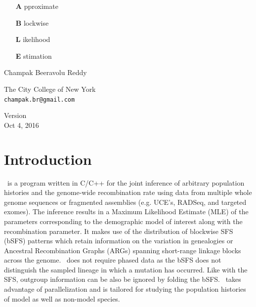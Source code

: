 \documentclass[pdftex,12pt]{article}
\newcommand{\incode}[1]{\tcbox[colback=blue!10!gray!10, colframe=blue!10!gray!40, boxrule=0.5pt, on line, size=fbox]{\texttt{\detokenize{#1}}}}
\newcommand{\ABLE}{\incode{ABLE}}
\newcommand{\RED}[1]{\textcolor{red}{\detokenize{#1}}}
\begin{document}
\begin{titlepage}
\centering
\vspace*{\fill}

\begin{center}
\begin{adjustwidth}{2.3in}{0in}
	\begin{itemize}
		\item [{\Huge \textbf{A}}] pproximate
		\item [{\Huge \textbf{B}}] lockwise
		\item [{\Huge \textbf{L}}] ikelihood
		\item [{\Huge \textbf{E}}] stimation
	\end{itemize}
\end{adjustwidth}
\end{center}

\vspace{2cm}

{\large Champak Beeravolu Reddy}

\vspace{0.5cm}

{\small The City College of New York} \\
{\small \texttt{champak.br@gmail.com}} \

\vspace{1cm}

Version \RED{xyz} \\
Oct 4, 2016

\vspace*{\fill}
\end{titlepage}

\vspace*{5cm}
\tableofcontents
\vspace*{\fill}

\clearpage


\section{Introduction}
\ABLE\ is a program written in C/C++ for the joint inference of arbitrary population histories and the genome-wide recombination rate using data from multiple whole genome sequences or fragmented assemblies (e.g. UCE's, RADSeq, and targeted exomes). The inference results in a Maximum Likelihood Estimate (MLE) of the parameters corresponding to the demographic model of interest along with the recombination parameter. It makes use of the distribution of blockwise SFS (bSFS) patterns which retain information on the variation in genealogies or Ancestral Recombination Graphs (ARGs) spanning short-range linkage blocks across the genome. \ABLE\ does not require phased data as the bSFS does not distinguish the sampled lineage in which a mutation has occurred. Like with the SFS, outgroup information can be also be ignored by folding the bSFS. \ABLE\ takes advantage of \incode{openmp} parallelization and is tailored for studying the population histories of model as well as non-model species.
\end{document}
